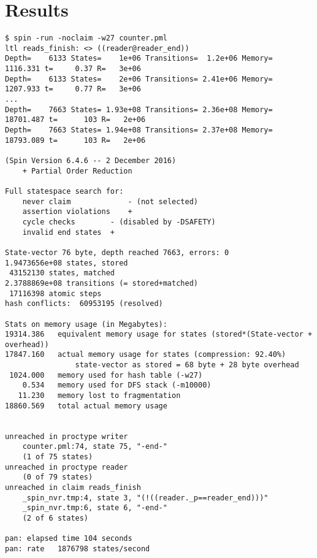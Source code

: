 \documentclass[a4paper]{scrartcl}
\begin{document}
\section{Results}
\begin{lstlisting}[float, caption = {\texttt{spin} output for correctness checking with \(B = 3\)}, label = lst:correctness]
$ spin -run -noclaim -w27 counter.pml
ltl reads_finish: <> ((reader@reader_end))
Depth=    6133 States=    1e+06 Transitions=  1.2e+06 Memory=  1116.331	t=     0.37 R=   3e+06
Depth=    6133 States=    2e+06 Transitions= 2.41e+06 Memory=  1207.933	t=     0.77 R=   3e+06
...
Depth=    7663 States= 1.93e+08 Transitions= 2.36e+08 Memory= 18701.487	t=      103 R=   2e+06
Depth=    7663 States= 1.94e+08 Transitions= 2.37e+08 Memory= 18793.089	t=      103 R=   2e+06

(Spin Version 6.4.6 -- 2 December 2016)
   	+ Partial Order Reduction

Full statespace search for:
   	never claim         	- (not selected)
   	assertion violations	+
   	cycle checks       	- (disabled by -DSAFETY)
   	invalid end states	+

State-vector 76 byte, depth reached 7663, errors: 0
1.9473656e+08 states, stored
 43152130 states, matched
2.3788869e+08 transitions (= stored+matched)
 17116398 atomic steps
hash conflicts:  60953195 (resolved)

Stats on memory usage (in Megabytes):
19314.386	equivalent memory usage for states (stored*(State-vector + overhead))
17847.160	actual memory usage for states (compression: 92.40%)
            	state-vector as stored = 68 byte + 28 byte overhead
 1024.000	memory used for hash table (-w27)
    0.534	memory used for DFS stack (-m10000)
   11.230	memory lost to fragmentation
18860.569	total actual memory usage


unreached in proctype writer
   	counter.pml:74, state 75, "-end-"
   	(1 of 75 states)
unreached in proctype reader
   	(0 of 79 states)
unreached in claim reads_finish
   	_spin_nvr.tmp:4, state 3, "(!((reader._p==reader_end)))"
   	_spin_nvr.tmp:6, state 6, "-end-"
   	(2 of 6 states)

pan: elapsed time 104 seconds
pan: rate   1876798 states/second
\end{lstlisting}
\end{document}
